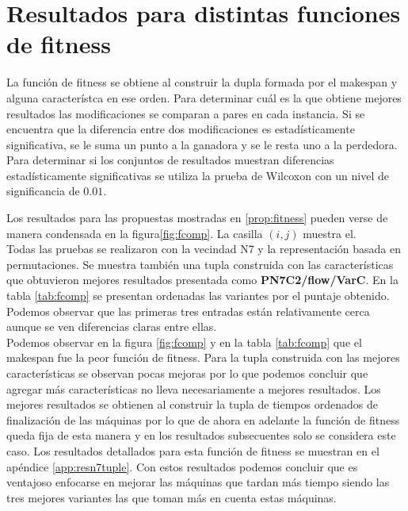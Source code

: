 \section{Resultados para distintas funciones de fitness}
  La función de fitness se obtiene al construir la dupla formada por el makespan y alguna característca en ese orden. Para determinar cuál es la que obtiene mejores resultados las modificaciones se comparan a pares en cada instancia. Si se encuentra que la diferencia entre dos modificaciones es estadísticamente significativa, se le suma un punto a la ganadora y se le resta uno a la perdedora.
Para determinar si los conjuntos de resultados muestran diferencias estadísticamente significativas se utiliza la prueba de Wilcoxon con un nivel de significancia de $0.01$. 

Los resultados para las propuestas mostradas en \ref{prop:fitness} pueden verse de manera condensada en la figura\ref{fig:fcomp}. La casilla $(i,j)$ muestra el.\\
Todas las pruebas se realizaron con la vecindad N7 y la representación basada en permutaciones. Se muestra también una tupla construida con las características que obtuvieron mejores resultados presentada como \textbf{PN7C2/flow/VarC}. En la tabla \ref{tab:fcomp} se presentan ordenadas las variantes por el puntaje obtenido. Podemos observar que las primeras tres entradas están relativamente cerca aunque se ven diferencias claras entre ellas.\\

Podemos observar en la figura \ref{fig:fcomp} y en la tabla \ref{tab:fcomp} que el makespan fue la peor función de fitness. Para la tupla construida con las mejores características se observan pocas mejoras por lo que podemos concluir que agregar más características no lleva necesariamente a mejores resultados. Los mejores resultados se obtienen al construir la tupla de tiempos ordenados de finalización de las máquinas por lo que de ahora en adelante la función de fitness queda fija de esta manera y en los resultados subsecuentes solo se considera este caso. Los resultados detallados para esta función de fitness se muestran en el apéndice \ref{app:resn7tuple}.
Con estos resultados podemos concluir que es ventajoso enfocarse en mejorar las máquinas que tardan más tiempo siendo las tres mejores variantes las que toman más en cuenta estas máquinas.

